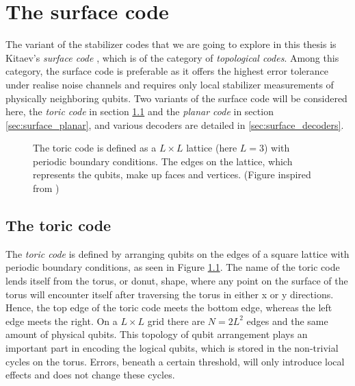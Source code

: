 
\chapter{The surface code}\label{ch:surfacecode}

The variant of the stabilizer codes that we are going to explore in this thesis is Kitaev's \emph{surface code} \cite{kitaev2003fault}, which is of the category of \emph{topological codes}. Among this category, the surface code is preferable as it offers the highest error tolerance under realise noise channels and requires only local stabilizer measurements of physically neighboring qubits. Two variants of the surface code will be considered here, the \emph{toric code} in section \ref{sec:surface_toric} and the \emph{planar code} in section \ref{sec:surface_planar}, and various decoders are detailed in \ref{sec:surface_decoders}.
\begin{figure}
  \centering
  \caption{The toric code is defined as a $L\times L$ lattice (here $L=3$) with periodic boundary conditions. The edges on the lattice, which represents the qubits, make up faces and vertices. (Figure inspired from \cite{browne})}\label{sf:fig_toriclattice}
\end{figure}

\section{The toric code}\label{sec:surface_toric}
The \emph{toric code} is defined by arranging qubits on the edges of a square lattice with periodic boundary conditions, as seen in Figure \ref{sf:fig_toriclattice}. The name of the toric code lends itself from the torus, or donut, shape, where any point on the surface of the torus will encounter itself after traversing the torus in either x or y directions. Hence, the top edge of the toric code meets the bottom edge, whereas the left edge meets the right. On a $L\times L$ grid there are $N = 2L^2$ edges and the same amount of physical qubits. This topology of qubit arrangement plays an important part in encoding the logical qubits, which is stored in the non-trivial cycles on the torus. Errors, beneath a certain threshold, will only introduce local effects and does not change these cycles.

